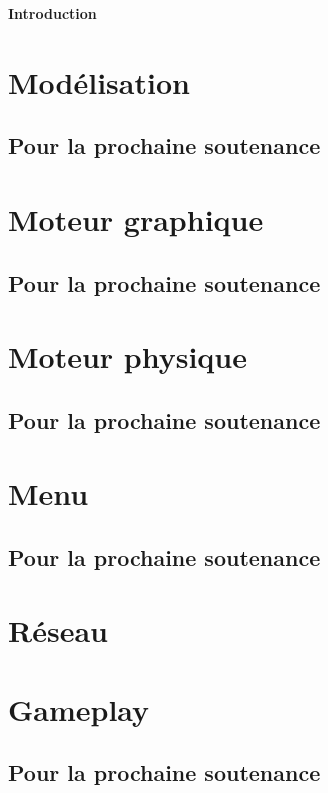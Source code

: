 \documentclass[11pt]{report}
\begin{document}
\tableofcontents

\newpage
\textbf{{\huge Introduction}} \vspace{7mm}

\newpage
\section{Modélisation}

\subsection{Pour la prochaine soutenance}

\newpage
\section{Moteur graphique}

\subsection{Pour la prochaine soutenance}

\newpage
\section{Moteur physique}

\subsection{Pour la prochaine soutenance}

\newpage
\section{Menu}

\subsection{Pour la prochaine soutenance}

\newpage
\section{Réseau}

\newpage
\section{Gameplay}

\subsection{Pour la prochaine soutenance}
\end{document}
